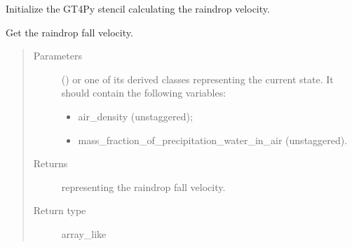 \documentclass[letterpaper,10pt,english]{sphinxmanual}
\begin{document}
\begin{fulllineitems}
\begin{fulllineitems}
\begin{quote}
\begin{description}
\end{description}\end{quote}

\end{fulllineitems}


\begin{fulllineitems}
\label{\detokenize{api:parameterizations.adjustment_microphysics_kessler_wrf.AdjustmentMicrophysicsKesslerWRF._stencil_raindrop_fall_velocity_initialize}}
Initialize the GT4Py stencil calculating the raindrop velocity.

\end{fulllineitems}


\begin{fulllineitems}
\label{\detokenize{api:parameterizations.adjustment_microphysics_kessler_wrf.AdjustmentMicrophysicsKesslerWRF.get_raindrop_fall_velocity}}
Get the raindrop fall velocity.
\begin{quote}\begin{description}
\item[{Parameters}] \leavevmode
{} () \textendash{} 
{\hyperref[\detokenize{api:storages.grid_data.GridData}]{}} or one of its derived classes representing the current state.
It should contain the following variables:
\begin{itemize}
\item {} 
air\_density (unstaggered);

\item {} 
mass\_fraction\_of\_precipitation\_water\_in\_air (unstaggered).

\end{itemize}


\item[{Returns}] \leavevmode
{} representing the raindrop fall velocity.

\item[{Return type}] \leavevmode
array\_like

\end{description}\end{quote}

\end{fulllineitems}


\end{fulllineitems}
\end{document}
